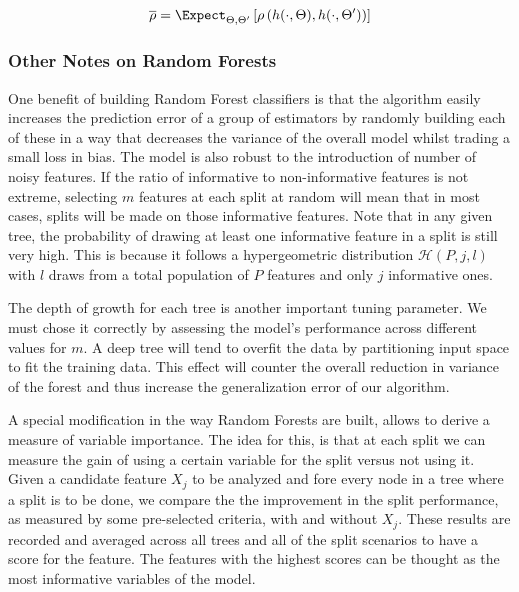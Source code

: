 $$ \overline{\rho} =  \Expect_{\Theta,\Theta'} \left[ \rho \left( h(\cdot{},\Theta) ,h(\cdot{},\Theta') \right)   \right] $$

\subsubsection{Other Notes on Random Forests}
One benefit of building Random Forest classifiers is that the algorithm easily increases the prediction error of a group of estimators by randomly building each of these in a way that decreases the variance of the overall model whilst trading a small loss in bias. The model is also robust to the introduction of number of noisy features. If the ratio of informative to non-informative features is not extreme, selecting $m$ features at each split at random will mean that in most cases, splits will be made on those informative features. Note that in any given tree, the probability of drawing at least one informative feature in a split is still very high. This is because it follows a hypergeometric distribution $\mathcal{H}(P,j,l)$ with $l$ draws from a total population of $P$ features and only $j$ informative ones.

The depth of growth for each tree is another important tuning parameter. We must chose it correctly by assessing the model's performance across different values for $m$.  A deep tree will tend to overfit the data by partitioning input space to fit the training data. This effect will counter the overall reduction in variance of the forest and thus increase the generalization error of our algorithm.


A special modification in the way Random Forests are built, allows to derive a measure of variable importance. The idea for this, is that at each split we can measure the gain of using a certain variable for the split versus not using it. Given a candidate feature $X_j$ to be analyzed and fore every node in a tree where a split is to be done, we compare the the improvement in the split performance, as measured by some pre-selected criteria, with and without $X_j$. These results are recorded and averaged across all trees and all of the split scenarios to have a score for the feature. The features with the highest scores can be thought as the most informative variables of the model.  

